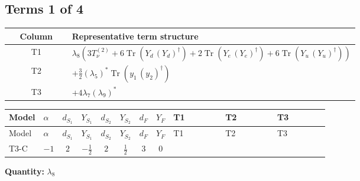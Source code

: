 \documentclass[8pt]{article}
\begin{document}
\begin{landscape}
\subsection*{Terms 1 of 4}
\begin{center}
\begin{tabular}{@{}c >{\raggedright\arraybackslash}p{0.82\linewidth}@{}}
\toprule
Column & Representative term structure \\
\midrule
T1 & \(\displaystyle {\lambda_{8}} (3 T_{\nu}^{(2)}+6 \operatorname{Tr}\!\left({Y_d}\,\left({Y_d}\right)^{\dagger}\right)+2 \operatorname{Tr}\!\left({Y_e}\,\left({Y_e}\right)^{\dagger}\right)+6 \operatorname{Tr}\!\left({Y_u}\,\left({Y_u}\right)^{\dagger}\right))\) \\
\midrule
T2 & \(\displaystyle +\frac{3}{2} \left({\lambda_5}\right)^{*} \operatorname{Tr}\!\left({y_1}\,\left({y_2}\right)^{\dagger}\right)\) \\
\midrule
T3 & \(\displaystyle +4 {\lambda_{7}} \left({\lambda_{9}}\right)^{*}\) \\
\midrule
\bottomrule
\end{tabular}
\end{center}
\smallskip
\tiny
\begin{longtable}{@{}llcccccc >{\raggedright\arraybackslash}p{0.21\linewidth} >{\raggedright\arraybackslash}p{0.21\linewidth} >{\raggedright\arraybackslash}p{0.21\linewidth}@{}}
\toprule
Model & $\alpha$ & $d_{S_1}$ & $Y_{S_1}$ & $d_{S_2}$ & $Y_{S_2}$ & $d_F$ & $Y_F$ & T1 & T2 & T3 \\
\midrule
\endfirsthead
\toprule
Model & $\alpha$ & $d_{S_1}$ & $Y_{S_1}$ & $d_{S_2}$ & $Y_{S_2}$ & $d_F$ & $Y_F$ & T1 & T2 & T3 \\
\midrule
\endhead
T3-C & $-1$ & $2$ & $-\frac{1}{2}$ & $2$ & $\frac{1}{2}$ & $3$ & $0$ & \scriptsize\adjustbox{max width=\linewidth}{$\begin{gathered} {\lambda_{8}} (3 T_{\nu}^{(2)}+6 \operatorname{Tr}\!\left({Y_d}\,\left({Y_d}\right)^{\dagger}\right)+2 \operatorname{Tr}\!\left({Y_e}\,\left({Y_e}\right)^{\dagger}\right)+6 \operatorname{Tr}\!\left({Y_u}\,\left({Y_u}\right)^{\dagger}\right))\end{gathered}$} & \scriptsize\adjustbox{max width=\linewidth}{$\begin{gathered} +\frac{3}{2} \left({\lambda_5}\right)^{*} \operatorname{Tr}\!\left({y_1}\,\left({y_2}\right)^{\dagger}\right)\end{gathered}$} & \scriptsize\adjustbox{max width=\linewidth}{$\begin{gathered} +4 {\lambda_{7}} \left({\lambda_{9}}\right)^{*}\end{gathered}$} \\
\midrule
\bottomrule
\end{longtable}
\clearpage
\noindent\textbf{Quantity: }$\lambda_{8}$\par\smallskip

\end{landscape}
\end{document}
